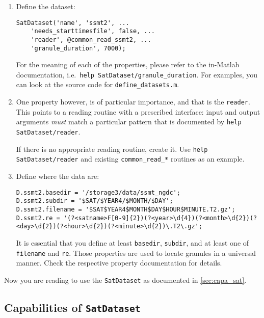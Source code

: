 \documentclass[a4paper,10pt]{article}
\begin{document}
\begin{enumerate}
\item Define the dataset:

\begin{lstlisting}
SatDataset('name', 'ssmt2', ...
    'needs_starttimesfile', false, ...
    'reader', @common_read_ssmt2, ...
    'granule_duration', 7000);
\end{lstlisting}

For the meaning of each of the properties, please refer to the in-Matlab
documentation, i.e.\ \lstinline|help SatDataset/granule_duration|.
For examples, you can look at the source code for
\lstinline|define_datasets.m|.

\item
One property however, is of particular importance, and that is the
\lstinline|reader|.
This points to a reading routine with a prescribed interface: input and
output arguments \emph{must} match a particular pattern that is documented
by \lstinline|help SatDataset/reader|.

If there is no appropriate reading routine, create it.
Use \lstinline|help SatDataset/reader| and existing
\lstinline|common_read_*| routines as an example.
\item
Define where the data are:

\begin{lstlisting}
D.ssmt2.basedir = '/storage3/data/ssmt_ngdc';
D.ssmt2.subdir = '$SAT/$YEAR4/$MONTH/$DAY';
D.ssmt2.filename = '$SAT$YEAR4$MONTH$DAY$HOUR$MINUTE.T2.gz';
D.ssmt2.re = '(?<satname>F[0-9]{2})(?<year>\d{4})(?<month>\d{2})(?<day>\d{2})(?<hour>\d{2})(?<minute>\d{2})\.T2\.gz';
\end{lstlisting}
 
It is essential that you define at least \lstinline|basedir|,
\lstinline|subdir|, and at least one of \lstinline|filename| and
\lstinline|re|.
Those properties are used to locate granules in a universal manner.
Check the respective property documentation for details.
\end{enumerate}

Now you are reading to use the \lstinline|SatDataset| as documented in
\autoref{sec:capa_sat}.

\subsection{Capabilities of \lstinline|SatDataset|}
\label{sec:capa_sat}
\end{document}
